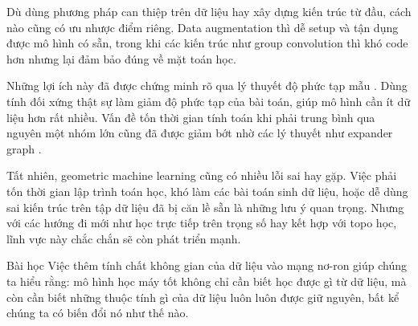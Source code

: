 Dù dùng phương pháp can thiệp trên dữ liệu hay xây dựng kiến trúc từ đầu, cách nào cũng có ưu nhược điểm riêng. Data augmentation thì dễ setup và tận dụng được mô hình có sẵn, trong khi các kiến trúc như group convolution thì khó code hơn nhưng lại đảm bảo đúng về mặt toán học.

Những lợi ích này đã được chứng minh rõ qua lý thuyết độ phức tạp mẫu \cite{tahmasebi2023exact}. Dùng tính đối xứng thật sự làm giảm độ phức tạp của bài toán, giúp mô hình cần ít dữ liệu hơn rất nhiều. Vấn đề tốn thời gian tính toán khi phải trung bình qua nguyên một nhóm lớn cũng đã được giảm bớt nhờ các lý thuyết như expander graph \cite{soleymani2025icml}. 

Tất nhiên, geometric machine learning cũng có nhiều lỗi sai hay gặp. Việc phải tốn thời gian lập trình toán học, khó làm các bài toán sinh dữ liệu, hoặc dễ dùng sai kiến trúc trên tập dữ liệu đã bị căn lề sẵn là những lưu ý quan trọng. Nhưng với các hướng đi mới như học trực tiếp trên trọng số hay kết hợp với topo học, lĩnh vực này chắc chắn sẽ còn phát triển mạnh.

\begin{infobox}{Bài học}
Việc thêm tính chất không gian của dữ liệu vào mạng nơ-ron giúp chúng ta hiểu rằng: mô hình học máy tốt không chỉ cần biết học được gì từ dữ liệu, mà còn cần biết những thuộc tính gì của dữ liệu luôn luôn được giữ nguyên, bất kể chúng ta có biến đổi nó như thế nào.
\end{infobox}

\clearpage

